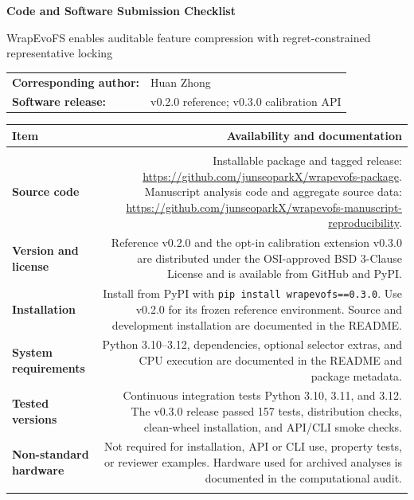 \documentclass[10pt,letterpaper]{article}
\newcommand{\topic}[1]{\sffamily\bfseries\color{TextGray}#1}
\begin{document}
{\sffamily\bfseries\LARGE Code and Software Submission Checklist}\par
\vspace{4pt}
{\large WrapEvoFS enables auditable feature compression with regret-constrained representative locking}\par
\vspace{7pt}
\begin{tabular}{@{}ll@{}}
\sffamily\bfseries Corresponding author: & Huan Zhong\\
\sffamily\bfseries Software release: & v0.2.0 reference; v0.3.0 calibration API
\end{tabular}
\vspace{8pt}

\begin{tabular}{@{}LR@{}}
\toprule
\sffamily\bfseries Item & \sffamily\bfseries Availability and documentation\\
\midrule
{}\\
\topic{Source code} & Installable package and tagged release: \url{https://github.com/junseoparkX/wrapevofs-package}. Manuscript analysis code and aggregate source data: \url{https://github.com/junseoparkX/wrapevofs-manuscript-reproducibility}.\\
\topic{Version and license} & Reference v0.2.0 and the opt-in calibration extension v0.3.0 are distributed under the OSI-approved BSD 3-Clause License and is available from GitHub and PyPI.\\
\topic{Installation} & Install from PyPI with \texttt{pip install wrapevofs==0.3.0}. Use v0.2.0 for its frozen reference environment. Source and development installation are documented in the README.\\
\topic{System requirements} & Python 3.10--3.12, dependencies, optional selector extras, and CPU execution are documented in the README and package metadata.\\
\topic{Tested versions} & Continuous integration tests Python 3.10, 3.11, and 3.12. The v0.3.0 release passed 157 tests, distribution checks, clean-wheel installation, and API/CLI smoke checks.\\
\topic{Non-standard hardware} & Not required for installation, API or CLI use, property tests, or reviewer examples. Hardware used for archived analyses is documented in the computational audit.\\
\midrule
{}\\

\end{tabular}
\end{document}
